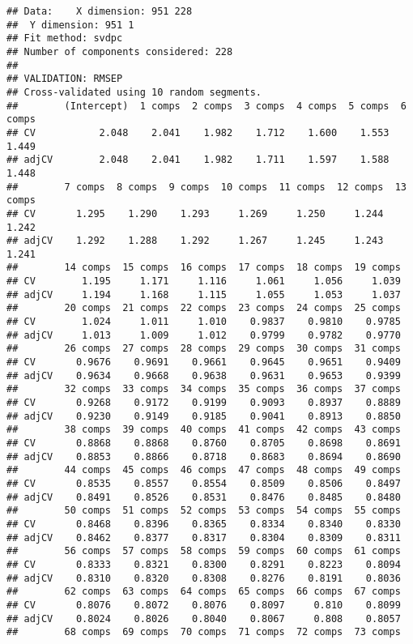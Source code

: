 \documentclass[]{article}
\begin{document}
\begin{verbatim}
## Data:    X dimension: 951 228 
##  Y dimension: 951 1
## Fit method: svdpc
## Number of components considered: 228
## 
## VALIDATION: RMSEP
## Cross-validated using 10 random segments.
##        (Intercept)  1 comps  2 comps  3 comps  4 comps  5 comps  6 comps
## CV           2.048    2.041    1.982    1.712    1.600    1.553    1.449
## adjCV        2.048    2.041    1.982    1.711    1.597    1.588    1.448
##        7 comps  8 comps  9 comps  10 comps  11 comps  12 comps  13 comps
## CV       1.295    1.290    1.293     1.269     1.250     1.244     1.242
## adjCV    1.292    1.288    1.292     1.267     1.245     1.243     1.241
##        14 comps  15 comps  16 comps  17 comps  18 comps  19 comps
## CV        1.195     1.171     1.116     1.061     1.056     1.039
## adjCV     1.194     1.168     1.115     1.055     1.053     1.037
##        20 comps  21 comps  22 comps  23 comps  24 comps  25 comps
## CV        1.024     1.011     1.010    0.9837    0.9810    0.9785
## adjCV     1.013     1.009     1.012    0.9799    0.9782    0.9770
##        26 comps  27 comps  28 comps  29 comps  30 comps  31 comps
## CV       0.9676    0.9691    0.9661    0.9645    0.9651    0.9409
## adjCV    0.9634    0.9668    0.9638    0.9631    0.9653    0.9399
##        32 comps  33 comps  34 comps  35 comps  36 comps  37 comps
## CV       0.9268    0.9172    0.9199    0.9093    0.8937    0.8889
## adjCV    0.9230    0.9149    0.9185    0.9041    0.8913    0.8850
##        38 comps  39 comps  40 comps  41 comps  42 comps  43 comps
## CV       0.8868    0.8868    0.8760    0.8705    0.8698    0.8691
## adjCV    0.8853    0.8866    0.8718    0.8683    0.8694    0.8690
##        44 comps  45 comps  46 comps  47 comps  48 comps  49 comps
## CV       0.8535    0.8557    0.8554    0.8509    0.8506    0.8497
## adjCV    0.8491    0.8526    0.8531    0.8476    0.8485    0.8480
##        50 comps  51 comps  52 comps  53 comps  54 comps  55 comps
## CV       0.8468    0.8396    0.8365    0.8334    0.8340    0.8330
## adjCV    0.8462    0.8377    0.8317    0.8304    0.8309    0.8311
##        56 comps  57 comps  58 comps  59 comps  60 comps  61 comps
## CV       0.8333    0.8321    0.8300    0.8291    0.8223    0.8094
## adjCV    0.8310    0.8320    0.8308    0.8276    0.8191    0.8036
##        62 comps  63 comps  64 comps  65 comps  66 comps  67 comps
## CV       0.8076    0.8072    0.8076    0.8097     0.810    0.8099
## adjCV    0.8024    0.8026    0.8040    0.8067     0.808    0.8057
##        68 comps  69 comps  70 comps  71 comps  72 comps  73 comps

\end{verbatim}
\end{document}
